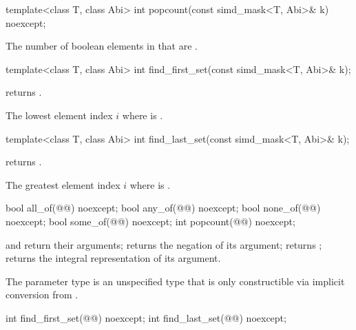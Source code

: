 \begin{itemdecl}
template<class T, class Abi> int popcount(const simd_mask<T, Abi>& k) noexcept;
\end{itemdecl}

\begin{itemdescr}
  \pnum\returns
  The number of boolean elements in  that are .
\end{itemdescr}

\begin{itemdecl}
template<class T, class Abi> int find_first_set(const simd_mask<T, Abi>& k);
\end{itemdecl}

\begin{itemdescr}
  \pnum\requires
   returns .

  \pnum\returns
  The lowest element index $i$ where  is .
\end{itemdescr}

\begin{itemdecl}
template<class T, class Abi> int find_last_set(const simd_mask<T, Abi>& k);
\end{itemdecl}

\begin{itemdescr}
  \pnum\requires
   returns .

  \pnum\returns
  The greatest element index $i$ where  is .
\end{itemdescr}

\begin{itemdecl}
bool all_of(@@) noexcept;
bool any_of(@@) noexcept;
bool none_of(@@) noexcept;
bool some_of(@@) noexcept;
int popcount(@@) noexcept;
\end{itemdecl}

\begin{itemdescr}
  \pnum\returns
   and  return their arguments;  returns the negation of its argument;  returns ;  returns the integral representation of its argument.

  \pnum\remarks
  The parameter type  is an unspecified type that is only constructible via implicit conversion from .
\end{itemdescr}

\begin{itemdecl}
int find_first_set(@@) noexcept;
int find_last_set(@@) noexcept;
\end{itemdecl}

